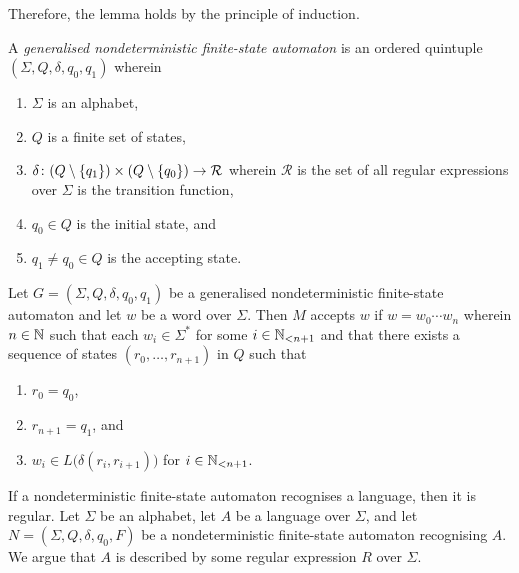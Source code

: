     Therefore, the lemma holds by the principle of induction.
\Epr

\Bdf
    A \emph{generalised nondeterministic finite-state automaton} is an ordered
    quintuple \((\Sigma, Q, \delta, q_0, q_1)\) wherein
    \begin{enumerate}
        \item \(\Sigma\) is an alphabet,
        \item \(Q\) is a finite set of states,
        \item \(\map{\delta}{(Q \setminus \set{q_1}) \times (Q \setminus
        \set{q_0})}{\mathcal{R}}\) wherein \(\mathcal{R}\) is the set of all
        regular expressions over \(\Sigma\) is the transition function,
        \item \(q_0 \in Q\) is the initial state, and
        \item \(q_1 \neq q_0 \in Q\) is the accepting state.
    \end{enumerate}
\Edf

Let \(G = (\Sigma, Q, \delta, q_0, q_1)\) be a generalised nondeterministic
finite-state automaton and let \(w\) be a word over \(\Sigma\). Then \(M\)
accepts \(w\) if \(w = w_0 \cdots w_n\) wherein \(n \in \setnat\) such that each
\(w_i \in \Sigma^*\) for some \(i \in \Nln[n + 1]\) and that there exists a
sequence of states \((r_0, \ldots, r_{n + 1})\) in \(Q\) such that
\begin{enumerate}
    \item \(r_0 = q_0\),
    \item \(r_{n + 1} = q_1\), and
    \item \(w_i \in L\big(\delta(r_i, r_{i + 1})\big)\) for \(i \in \Nln[n +
    1]\).
\end{enumerate}

\Blm
    \label{lem2}
    If a nondeterministic finite-state automaton recognises a language, then it
    is regular.
\Elm
\Bpr
    Let \(\Sigma\) be an alphabet, let \(A\) be a language over \(\Sigma\), and
    let \(N = (\Sigma, Q, \delta, q_0, F)\) be a nondeterministic finite-state
    automaton recognising \(A\). We argue that \(A\) is described by some
    regular expression \(R\) over \(\Sigma\).

